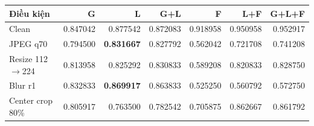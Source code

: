 \scriptsize
\begin{tabular}{lrrrrrr}
\toprule
Điều kiện & G & L & G+L & F & L+F & G+L+F \\
\midrule
Clean & 0.847042 & 0.877542 & 0.872083 & 0.918958 & 0.950958 & 0.952917 \\
JPEG q70 & 0.794500 & \textbf{0.831667} & 0.827792 & 0.562042 & 0.721708 & 0.741208 \\
Resize 112$\to$224 & 0.813958 & 0.825292 & 0.830833 & 0.589208 & 0.820833 & 0.828750 \\
Blur r1 & 0.832833 & \textbf{0.869917} & 0.863833 & 0.525250 & 0.560792 & 0.572750 \\
Center crop 80\% & 0.805917 & 0.763500 & 0.782542 & 0.705875 & 0.862667 & 0.861792 \\
\bottomrule
\end{tabular}
